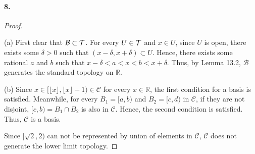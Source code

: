   \paragraph{8.}
  \begin{proof}
    $\,$\par
    (a) First clear that $\mathcal{B}\subset\mathcal{T}$. For every $U\in\mathcal{T}$ and $x\in 
    U$, since $U$ is open, there exists some $\delta>0$ such that $(x-\delta,x+
    \delta)\subset U$. Hence, there exists some rational $a$ and $b$ such that
    $x-\delta<a<x<b<x+\delta$. Thus, by Lemma 13.2, $\mathcal{B}$ generates the 
    standard topology on $\mathbb{R}$.\par
    (b) Since $x\in[\lfloor x\rfloor,\lfloor x\rfloor+1)\in\mathcal{C}$ for 
    every $x\in\mathbb{R}$, the first condition for a basis is satisfied. 
    Meanwhile, for every $B_1=[a,b)$ and $B_2=[c,d)$ in $\mathcal{C}$, if they
    are not disjoint, $[c,b)=B_1\cap B_2$ is also in $\mathcal{C}$. Hence, the
    second condition is satisfied. Thus, $\mathcal{C}$ is a basis.\par
    Since $[\sqrt{2},2)$ can not be represented by union of elements in 
    $\mathcal{C}$, $\mathcal{C}$ does not generate the lower limit topology.
  \end{proof}
























